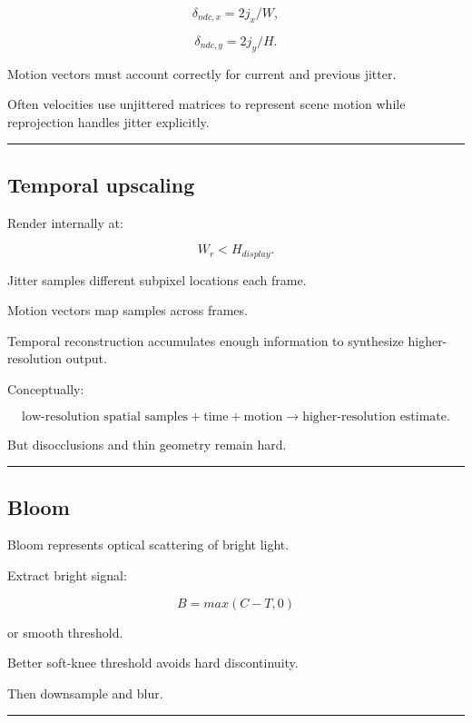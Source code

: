 \[
\delta_{ndc,x}
=
2j_x/W,
\]

\[
\delta_{ndc,y}
=
2j_y/H.
\]

Motion vectors must account correctly for current and previous jitter.

Often velocities use unjittered matrices to represent scene motion while reprojection handles jitter explicitly.

\begin{center}\rule{0.5\linewidth}{0.5pt}\end{center}

\subsection{Temporal upscaling}\label{04-visual-computing-ii-ch040-temporal-upscaling}

Render internally at:

\[
W_r<H_{display}.
\]

Jitter samples different subpixel locations each frame.

Motion vectors map samples across frames.

Temporal reconstruction accumulates enough information to synthesize higher-resolution output.

Conceptually:

\[
\boxed{
\text{low-resolution spatial samples}
+
\text{time}
+
\text{motion}
\rightarrow
\text{higher-resolution estimate}.
}
\]

But disocclusions and thin geometry remain hard.

\begin{center}\rule{0.5\linewidth}{0.5pt}\end{center}

\subsection{Bloom}\label{04-visual-computing-ii-ch040-bloom}

Bloom represents optical scattering of bright light.

Extract bright signal:

\[
B=
max(
C-T,
0
)
\]

or smooth threshold.

Better soft-knee threshold avoids hard discontinuity.

Then downsample and blur.

\begin{center}\rule{0.5\linewidth}{0.5pt}\end{center}

